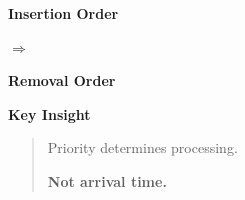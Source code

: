 \documentclass[11pt,a4paper]{book}
\begin{document}
\begin{center}
\begin{minipage}{0.42\textwidth}
\centering
\textcolor{RosettaBlue}{\textbf{Insertion Order}}

\vspace{0.5em}


\end{minipage}
\hfill
{\Large\textcolor{RosettaGray}{$\Longrightarrow$}}
\hfill
\begin{minipage}{0.42\textwidth}
\centering
\textcolor{RosettaDeepGreen}{\textbf{Removal Order}}

\vspace{0.5em}


\end{minipage}
\end{center}

\bigskip

\noindent
\textcolor{RosettaRoyalPurple}{\textbf{Key Insight}}

\begin{quote}
Priority determines processing.

\medskip

\textbf{Not arrival time.}
\end{quote}





\end{document}
